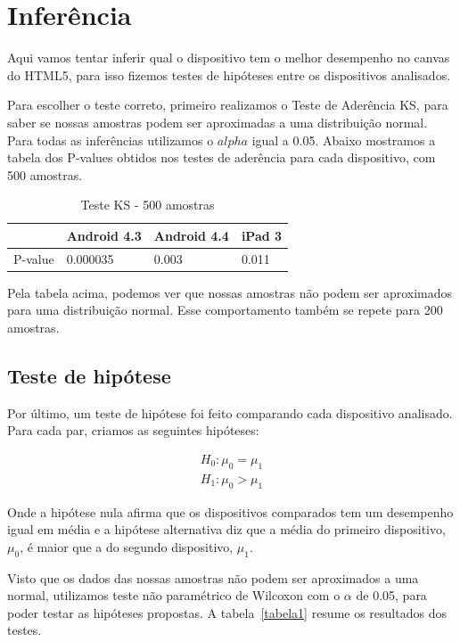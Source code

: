 \documentclass[11pt,a4paper]{article}
\begin{document}
\section{Inferência}\label{inferencia}
Aqui vamos tentar inferir qual o dispositivo tem o melhor desempenho no canvas do HTML5, para isso fizemos testes de
hipóteses entre os dispositivos analisados.

Para escolher o teste correto, primeiro realizamos o Teste de Aderência KS, para saber se nossas amostras podem ser
aproximadas a uma distribuição normal. Para todas as inferências utilizamos o \(alpha\) igual a 0.05. Abaixo mostramos a
tabela dos P-values obtidos nos testes de aderência para cada dispositivo, com 500 amostras.

\begin{table}[H]
    \centering
    \caption{Teste KS - 500 amostras}
    \begin{tabular}{| l | l | l | l |}
    \hline
     & Android 4.3 & Android 4.4 & iPad 3 \\ \hline
    P-value & 0.000035 & 0.003 & 0.011 \\ \hline
    \end{tabular}
\end{table}

Pela tabela acima, podemos ver que nossas amostras não podem ser aproximados para uma distribuição normal. Esse
comportamento também se repete para 200 amostras.

\subsection{Teste de hipótese}\label{testedehipotese}

Por último, um teste de hipótese foi feito comparando cada dispositivo analisado. Para cada par, criamos as seguintes
hipóteses:

\begin{align*}
        H_0: \mu_0 = \mu_1 \\
        H_1: \mu_0 > \mu_1
\end{align*}

Onde a hipótese nula afirma que os dispositivos comparados tem um desempenho igual em média e a hipótese alternativa
diz que a média do primeiro dispositivo, \(\mu_0\), é maior que a do segundo dispositivo, \(\mu_1\).

Visto que os dados das nossas amostras não podem ser aproximados a uma normal, utilizamos teste não paramétrico de
Wilcoxon com o \(\alpha\) de 0.05, para poder testar as hipóteses propostas. A tabela~\ref{tabela1} resume os
resultados dos testes.
\end{document}
